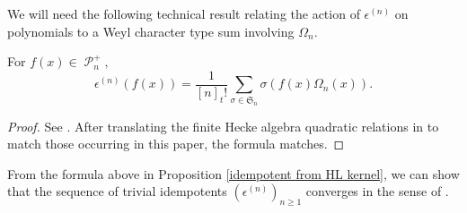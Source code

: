 \documentclass[ALCO,Unicode]{cedram}
\DeclareMathOperator{\sP}{\mathscr{P} }
\begin{document}
We will need the following technical result relating the action of $\epsilon^{(n)}$ on polynomials to a Weyl character type sum involving $\Omega_n$.

\begin{prop}\label{idempotent from HL kernel}
    For $f(x) \in \sP_n^{+},$ 
    \begin{equation}
        \epsilon^{(n)}(f(x)) = \frac{1}{[n]_{t}!} \sum_{\sigma \in \mathfrak{S}_n} \sigma( f(x)\Omega_n(x) ).
    \end{equation}
\end{prop}
\begin{proof}
   See \cite[Remark 4.17]{ram2006alcove}. After translating the finite Hecke algebra quadratic relations in \cite{ram2006alcove} to match those occurring in this paper, the formula matches.
\end{proof}

From the formula above in Proposition \ref{idempotent from HL kernel}, we can show that the sequence of trivial idempotents $(\epsilon^{(n)})_{n\geq 1}$ converges in the sense of \cite{Ion_2022}. 
\end{document}
